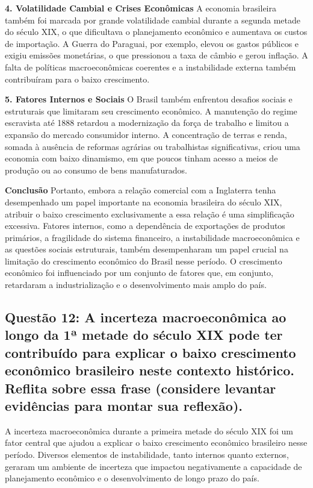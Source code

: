 \documentclass[a4paper,12pt]{article}[abntex2]
\begin{document}
\textbf{4. Volatilidade Cambial e Crises Econômicas}
A economia brasileira também foi marcada por grande volatilidade cambial durante a segunda metade do século XIX, o que dificultava o planejamento econômico e aumentava os custos de importação. A Guerra do Paraguai, por exemplo, elevou os gastos públicos e exigiu emissões monetárias, o que pressionou a taxa de câmbio e gerou inflação. A falta de políticas macroeconômicas coerentes e a instabilidade externa também contribuíram para o baixo crescimento.

\textbf{5. Fatores Internos e Sociais}
O Brasil também enfrentou desafios sociais e estruturais que limitaram seu crescimento econômico. A manutenção do regime escravista até 1888 retardou a modernização da força de trabalho e limitou a expansão do mercado consumidor interno. A concentração de terras e renda, somada à ausência de reformas agrárias ou trabalhistas significativas, criou uma economia com baixo dinamismo, em que poucos tinham acesso a meios de produção ou ao consumo de bens manufaturados.

\textbf{Conclusão}
Portanto, embora a relação comercial com a Inglaterra tenha desempenhado um papel importante na economia brasileira do século XIX, atribuir o baixo crescimento exclusivamente a essa relação é uma simplificação excessiva. Fatores internos, como a dependência de exportações de produtos primários, a fragilidade do sistema financeiro, a instabilidade macroeconômica e as questões sociais estruturais, também desempenharam um papel crucial na limitação do crescimento econômico do Brasil nesse período. O crescimento econômico foi influenciado por um conjunto de fatores que, em conjunto, retardaram a industrialização e o desenvolvimento mais amplo do país.

\subsection{\textbf{Questão 12: A incerteza macroeconômica ao longo da 1ª metade do século XIX pode ter contribuído para explicar o baixo crescimento econômico brasileiro neste contexto histórico. Reflita sobre essa frase (considere levantar evidências para montar sua reflexão).}}

A incerteza macroeconômica durante a primeira metade do século XIX foi um fator central que ajudou a explicar o baixo crescimento econômico brasileiro nesse período. Diversos elementos de instabilidade, tanto internos quanto externos, geraram um ambiente de incerteza que impactou negativamente a capacidade de planejamento econômico e o desenvolvimento de longo prazo do país.
\end{document}
